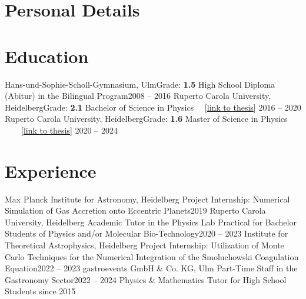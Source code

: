 \documentclass{cv}
\begin{document}
    \header
        \section{Personal Details}
        \personalDetails
        \section{Education}\vspace*{1mm}
        \resumeSubHeadingListStart
            \resumeSubheading
                {Hans-und-Sophie-Scholl-Gymnasium\textnormal{, Ulm}}{Grade: \textbf{1.5}}
                {High School Diploma (Abitur) in the Bilingual Program}{2008 -- 2016}
            \resumeSubheading
                {Ruperto Carola University\textnormal{, Heidelberg}}{Grade: \textbf{2.1}}
                {Bachelor of Science in Physics 
                    \ \ [\href{https://fs.mader.xyz/pdf/theses/bsc-thesis.pdf}{link to thesis}]
                }{2016 -- 2020}
            \resumeSubheading
                {Ruperto Carola University\textnormal{, Heidelberg}}{Grade: \textbf{1.6}}
                {Master of Science in Physics
                    \ \ \ \ [\href{https://fs.mader.xyz/pdf/theses/msc-thesis.pdf}{link to thesis}]
                }{2020 -- 2024}
        \resumeSubHeadingListEnd\vspace*{1mm}
        \section{Experience}\vspace*{1mm}
        \resumeSubHeadingListStart
            \resumeSubheading
                {Max Planck Institute for Astronomy\textnormal{, Heidelberg}}{}
                {Project Internship: Numerical Simulation of Gas Accretion onto Eccentric Planets}{2019}
            \resumeSubheading
                {Ruperto Carola University\textnormal{, Heidelberg}}{}
                {Academic Tutor in the Physics Lab Practical for Bachelor Students of Physics and/or
                Molecular Bio-Technology}{2020 -- 2023}
            \resumeSubheading
                {Institute for Theoretical Astrophysics\textnormal{, Heidelberg}}{}
                {Project Internship: Utilization of Monte Carlo Techniques for the 
                 Numerical Integration of the Smoluchowski Coagulation Equation}{2022 -- 2023}
            \resumeSubheading
                {gastroevents GmbH \& Co. KG\textnormal{, Ulm}}{}
                {Part-Time Staff in the Gastronomy Sector}{2022 -- 2024}
            \resumeSubheading
                {Physics \& Mathematics Tutor for High School Students}{}
                {}{since 2015}\vspace*{-4mm}
        \resumeSubHeadingListEnd
\end{document}

